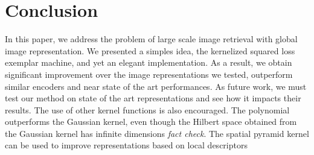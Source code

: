 \section{Conclusion}
\label{conclusion}
In this paper, we address the problem of large scale image retrieval with global image representation. 
We presented a simples idea, the kernelized squared loss exemplar machine, and yet an elegant implementation. 
As a result, we obtain significant improvement over the image representations we tested, outperform similar encoders and near state of the art performances.
As future work, we must test our method on state of the art representations and see how it impacts their results.
The use of other kernel functions is also encouraged. The polynomial outperforms the Gaussian kernel, even though the Hilbert space obtained from the Gaussian kernel has infinite dimensions \emph{\color{red} fact check}. 
The spatial pyramid kernel can be used to improve representations based on local descriptors
